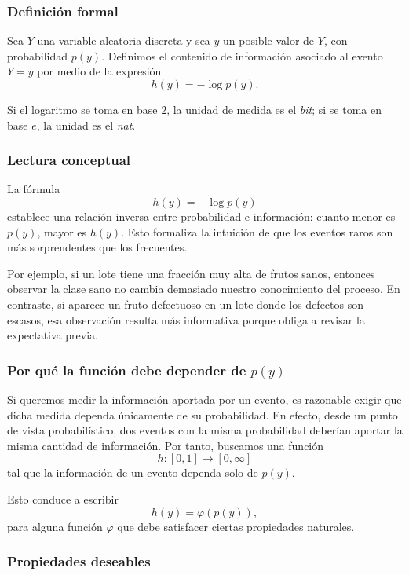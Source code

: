 \documentclass{article}
\begin{document}
\subsubsection*{Definición formal}

Sea \(Y\) una variable aleatoria discreta y sea \(y\) un posible valor de \(Y\), con probabilidad \(p(y)\). Definimos el contenido de información asociado al evento \(Y=y\) por medio de la expresión
\[
h(y) = -\log p(y).
\]

Si el logaritmo se toma en base \(2\), la unidad de medida es el \textit{bit}; si se toma en base \(e\), la unidad es el \textit{nat}.

\subsubsection*{Lectura conceptual}

La fórmula
\[
h(y) = -\log p(y)
\]
establece una relación inversa entre probabilidad e información: cuanto menor es \(p(y)\), mayor es \(h(y)\). Esto formaliza la intuición de que los eventos raros son más sorprendentes que los frecuentes.

Por ejemplo, si un lote tiene una fracción muy alta de frutos sanos, entonces observar la clase \(\text{sano}\) no cambia demasiado nuestro conocimiento del proceso. En contraste, si aparece un fruto defectuoso en un lote donde los defectos son escasos, esa observación resulta más informativa porque obliga a revisar la expectativa previa.

\subsubsection*{Por qué la función debe depender de \(p(y)\)}

Si queremos medir la información aportada por un evento, es razonable exigir que dicha medida dependa únicamente de su probabilidad. En efecto, desde un punto de vista probabilístico, dos eventos con la misma probabilidad deberían aportar la misma cantidad de información. Por tanto, buscamos una función
\[
h:[0,1]\to [0,\infty]
\]
tal que la información de un evento dependa solo de \(p(y)\).

Esto conduce a escribir
\[
h(y)=\varphi(p(y)),
\]
para alguna función \(\varphi\) que debe satisfacer ciertas propiedades naturales.

\subsubsection*{Propiedades deseables}
\end{document}
